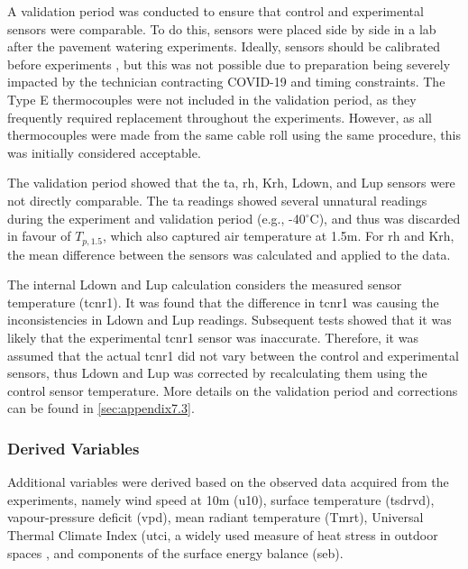 \documentclass[final,3p,times,authoryear]{elsarticle}
\begin{document}
A validation period was conducted to ensure that control and experimental sensors were
comparable. To do this, sensors were placed side by side in a lab after the pavement
watering experiments. Ideally, sensors should be calibrated before experiments \citep{Phillips2001}, but this was not possible due to preparation being severely impacted by the technician contracting COVID-19 and timing constraints. The Type E thermocouples
were not included in the validation period, as they frequently required replacement
throughout the experiments. However, as all thermocouples were made from the same
cable roll using the same procedure, this was initially considered acceptable.

The validation period showed that the \gls{ta}, \gls{rh}, \gls{Krh}, \gls{Ldown}, and \gls{Lup} sensors were not directly comparable. The \gls{ta} readings showed several unnatural readings during the experiment and validation period (e.g., -40$^{\circ}$C), and thus was discarded in favour of $T_{p,1.5}$, which also captured air temperature at 1.5m. For \gls{rh} and \gls{Krh}, the mean difference between the sensors was calculated and applied to the data. 

The internal \gls{Ldown} and \gls{Lup} calculation considers the measured sensor temperature (\gls{tcnr1}). It was found that the difference in \gls{tcnr1} was causing the inconsistencies in \gls{Ldown} and \gls{Lup} readings. Subsequent tests showed that it was likely that the experimental \gls{tcnr1} sensor was inaccurate. Therefore, it was assumed that the actual \gls{tcnr1} did not vary between the control and experimental sensors, thus \gls{Ldown} and \gls{Lup} was corrected by recalculating them using the control sensor temperature. More details on the validation period and corrections can be found in \ref{sec:appendix7.3}.

\subsubsection{Derived Variables}\label{sec:methods2.2.2}

Additional variables were derived based on the observed data acquired from the
experiments, namely wind speed at 10m (\gls{u10}), surface temperature (\gls{tsdrvd}), vapour-pressure deficit (\gls{vpd}), mean radiant temperature (\gls{Tmrt}), Universal Thermal Climate Index (\gls{utci}, a widely used measure of heat stress in outdoor spaces \citep{Zare2018a}, and components of the surface energy balance (\gls{seb}).
\end{document}
